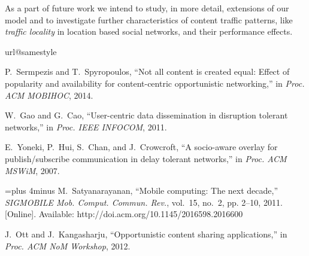 \documentclass[journal]{IEEEtran}
\begin{document}
As a part of future work we intend to study, in more detail, extensions of our model and to investigate further characteristics of content traffic patterns, like \textit{traffic locality} in location based social networks, and their performance effects.







\ifCLASSOPTIONcaptionsoff
  \newpage
\fi



\begin{thebibliography}{10}
\providecommand{\url}[1]{#1}
\csname url@samestyle\endcsname
\providecommand{\newblock}{\relax}
\providecommand{\bibinfo}[2]{#2}
\providecommand{\BIBentrySTDinterwordspacing}{\spaceskip=0pt\relax}
\providecommand{\BIBentryALTinterwordstretchfactor}{4}
\providecommand{\BIBentryALTinterwordspacing}{\spaceskip=\fontdimen2\font plus
\BIBentryALTinterwordstretchfactor\fontdimen3\font minus
  \fontdimen4\font\relax}
\providecommand{\BIBforeignlanguage}[2]{{\expandafter\ifx\csname l@#1\endcsname\relax
\typeout{** WARNING: IEEEtran.bst: No hyphenation pattern has been}\typeout{** loaded for the language `#1'. Using the pattern for}\typeout{** the default language instead.}\else
\language=\csname l@#1\endcsname
\fi
#2}}
\providecommand{\BIBdecl}{\relax}
\BIBdecl

P.~Sermpezis and T.~Spyropoulos, ``{N}ot all content is created equal: {E}ffect
  of popularity and availability for content-centric opportunistic
  networking,'' in \emph{Proc. ACM MOBIHOC}, 2014.

W.~Gao and G.~Cao, ``User-centric data dissemination in disruption tolerant
  networks,'' in \emph{Proc. IEEE INFOCOM}, 2011.

E.~Yoneki, P.~Hui, S.~Chan, and J.~Crowcroft, ``A socio-aware overlay for
  publish/subscribe communication in delay tolerant networks,'' in \emph{Proc.
  ACM MSWiM}, 2007.

\BIBentryALTinterwordspacing
M.~Satyanarayanan, ``Mobile computing: The next decade,'' \emph{SIGMOBILE Mob.
  Comput. Commun. Rev.}, vol.~15, no.~2, pp. 2--10, 2011. [Online]. Available:
  \url{http://doi.acm.org/10.1145/2016598.2016600}
\BIBentrySTDinterwordspacing

J.~Ott and J.~Kangasharju, ``Opportunistic content sharing applications,'' in
  \emph{Proc. ACM NoM Workshop}, 2012.


\end{thebibliography}
\end{document}
